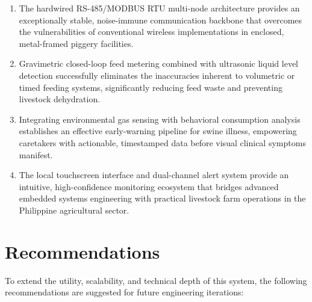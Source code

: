 \begin{enumerate}[label=\arabic*.]
    \item The hardwired RS-485/MODBUS RTU multi-node architecture provides an exceptionally stable, noise-immune communication backbone that overcomes the vulnerabilities of conventional wireless implementations in enclosed, metal-framed piggery facilities.
    
    \item Gravimetric closed-loop feed metering combined with ultrasonic liquid level detection successfully eliminates the inaccuracies inherent to volumetric or timed feeding systems, significantly reducing feed waste and preventing livestock dehydration.
    
    \item Integrating environmental gas sensing with behavioral consumption analysis establishes an effective early-warning pipeline for swine illness, empowering caretakers with actionable, timestamped data before visual clinical symptoms manifest.
    
    \item The local touchscreen interface and dual-channel alert system provide an intuitive, high-confidence monitoring ecosystem that bridges advanced embedded systems engineering with practical livestock farm operations in the Philippine agricultural sector.
\end{enumerate}

\section{Recommendations}

To extend the utility, scalability, and technical depth of this system, the following recommendations are suggested for future engineering iterations:

